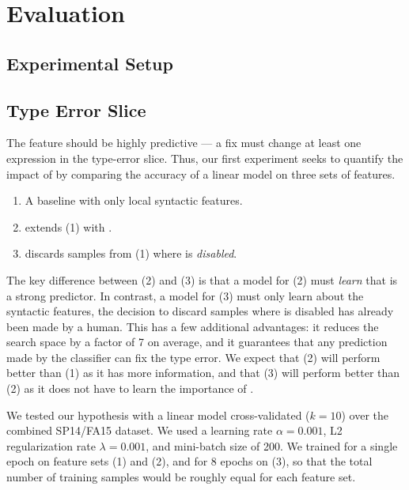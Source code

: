 \section{Evaluation}
\label{sec:evaluation}



\subsection{Experimental Setup}
\label{sec:experimental-setup}

\subsection{Type Error Slice}
\label{sec:type-error-slice}
The \InSlice feature should be highly predictive --- a fix must change
at least one expression in the type-error slice.
%
Thus, our first experiment seeks to quantify the impact of \InSlice by
comparing the accuracy of a linear model on three sets of features.
%
\begin{enumerate}
\item A baseline with only local syntactic features.
\item extends (1) with \InSlice.
\item discards samples from (1) where \InSlice is \emph{disabled}.
\end{enumerate}
%
The key difference between (2) and (3) is that a model for (2) must
\emph{learn} that \InSlice is a strong predictor.
%
In contrast, a model for (3) must only learn about the syntactic
features, the decision to discard samples where \InSlice is disabled has
already been made by a human.
%
This has a few additional advantages: it reduces the search space by a
factor of 7 on average, and it guarantees that any prediction made by
the classifier can fix the type error.
%
We expect that (2) will perform better than (1) as it has more
information, and that (3) will perform better than (2) as it does not
have to learn the importance of \InSlice.

We tested our hypothesis with a linear model cross-validated ($k=10$)
over the combined SP14/FA15 dataset. We used a learning rate
$\alpha=0.001$, L2 regularization rate $\lambda=0.001$, and mini-batch
size of 200. We trained for a single epoch on feature sets (1) and
(2), and for 8 epochs on (3), so that the total number of training samples
would be roughly equal for each feature set.

